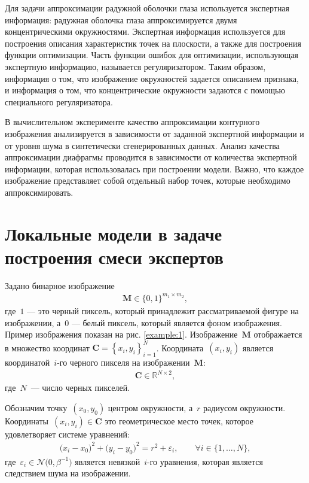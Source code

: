 Для задачи аппроксимации радужной оболочки глаза используется экспертная информация: радужная оболочка глаза аппроксимируется двумя концентрическими окружностями. Экспертная информация используется для построения описания характеристик точек на плоскости, а также для построения функции оптимизации. Часть функции ошибок для оптимизации, использующая экспертную информацию, называется регуляризатором. Таким образом, информация о том, что изображение окружностей задается описанием признака, и информация о том, что концентрические окружности задаются с помощью специального регуляризатора.

В вычислительном эксперименте качество аппроксимации контурного изображения анализируется в зависимости от заданной экспертной информации и от уровня шума в синтетически сгенерированных данных. Анализ качества аппроксимации диафрагмы проводится в зависимости от количества экспертной информации, которая использовалась при построении модели. Важно, что каждое изображение представляет собой отдельный набор точек, которые необходимо аппроксимировать.

\section{Локальные модели в задаче построения смеси экспертов}
Задано бинарное изображение
\[
\label{ch4-eq:st:cr:1}
\begin{aligned}
\textbf{M} \in \{0,1\}^{m_1 \times m_2},
\end{aligned}
\]
где~$1$ --- это черный пиксель, который принадлежит рассматриваемой фигуре на изображении, а~$0$ --- белый пиксель, который является фоном изображения. 
Пример изображения показан на рис. \ref{example:1}.
Изображение~$\textbf{M}$ отображается в множество координат \mbox{$\textbf{C}=\left\{x_i, y_i\right\}_{i=1}^{N}$}. Координата~$(x_i, y_i)$ является координатой~$i$-го черного пикселя на изображении~$\textbf{M}$:
\[
\label{ch4-eq:st:cr:2}
\begin{aligned}
\textbf{C} \in  \mathbb{R}^{N \times 2},
\end{aligned}
\]
где~$N$~--- число черных пикселей.

Обозначим точку~$(x_0, y_0)$ центром окружности, а~$r$ радиусом окружности.
Координаты~$\left(x_i, y_i\right)\in\textbf{C}$ это геометрическое место точек, которое удовлетворяет системе уравнений:
\[
\label{ch4-eq:st:cr:3}
\begin{aligned}
\bigr(x_i - x_0\bigr)^{2}+\bigr(y_i-y_0\bigr)^2 = r^2 + \varepsilon_i, \qquad \forall i \in \{1, \ldots, N\},
\end{aligned}
\]
где~$\varepsilon_i \in \mathcal{N}\bigr(0, \beta^{-1}\bigr)$ является невязкой~$i$-го уравнения, которая является следствием шума на изображении.

